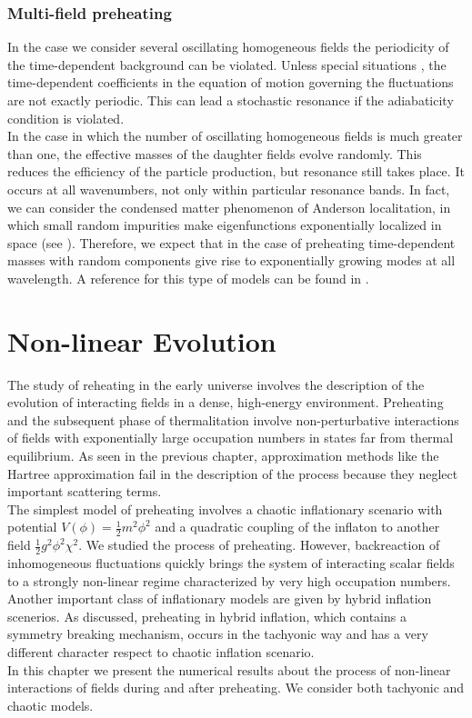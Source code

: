 \documentclass[11pt,a4paper,twoside]{book}
\begin{document}
\subsection{Multi-field preheating}
In the case we consider several oscillating homogeneous fields the periodicity of the time-dependent background can be violated. Unless special situations \cite{Chap4:Lozanov}, the time-dependent coefficients in the equation of motion governing the fluctuations are not exactly periodic. This can lead a stochastic resonance if the adiabaticity condition is violated. \\
In the case in which the number of oscillating homogeneous fields is much greater than one, the effective masses of the daughter fields evolve randomly. This reduces the efficiency of the particle production, but resonance still takes place. It occurs at all wavenumbers, not only within particular resonance bands. In fact, we can consider the condensed matter phenomenon of Anderson localitation, in which small random impurities make eigenfunctions exponentially localized in space (see \cite{Chap4:Lozanov}). Therefore, we expect that in the case of preheating time-dependent masses with random components give rise to exponentially growing modes at all wavelength. A reference for this type of models can  be found in \cite{Chap4:multifieldPreheating}.

\chapter{Non-linear Evolution}
The study of reheating in the early universe involves the description of the evolution of interacting fields in a dense, high-energy environment.  Preheating and the subsequent phase of thermalitation involve non-perturbative interactions of fields with exponentially large occupation numbers in states far from thermal equilibrium. As seen in the previous chapter, approximation methods like the Hartree approximation fail in the description of the process because they neglect important scattering terms.\\
The simplest model of preheating involves a chaotic inflationary scenario with potential $ V(\phi)=\frac{1}{2}m^{2}\phi^{2} $ and a quadratic coupling  of the inflaton to another field $ \frac{1}{2}g^{2}\phi^{2}\chi^{2} $. We studied the process of preheating. However, backreaction of inhomogeneous fluctuations quickly brings the system of interacting scalar fields to a strongly non-linear regime characterized  by very high occupation numbers.\\
Another important class of inflationary models are given by hybrid inflation scenerios. As discussed, preheating in hybrid inflation, which contains a symmetry breaking mechanism, occurs in the tachyonic way and has a very different character respect to chaotic inflation scenario. \\
In this chapter we present the numerical results about the process of non-linear interactions of fields during and after preheating. We consider both tachyonic and chaotic models.
\end{document}
